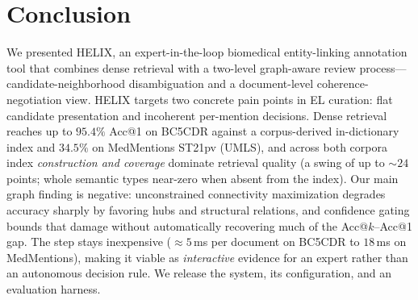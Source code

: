 \documentclass[runningheads]{llncs}
\begin{document}
\section{Conclusion}
\label{sec:conclusion}

We presented HELIX, an expert-in-the-loop biomedical entity-linking annotation
tool that combines dense retrieval with a two-level graph-aware review
process---candidate-neighborhood disambiguation and a document-level
coherence-negotiation view. HELIX targets two concrete
pain points in EL curation: flat candidate presentation and incoherent
per-mention decisions. Dense retrieval reaches up to $95.4\%$ Acc@1 on BC5CDR against
a corpus-derived in-dictionary index and $34.5\%$ on MedMentions ST21pv (UMLS), and
across both corpora index \emph{construction and coverage} dominate retrieval quality
(a swing of up to ${\sim}24$ points; whole semantic types near-zero when absent from
the index). Our main graph finding is negative: unconstrained connectivity
maximization degrades accuracy sharply by favoring hubs and structural relations,
and confidence gating bounds that damage without automatically recovering much of the
Acc@$k$--Acc@1 gap. The step stays inexpensive (${\approx}5$\,ms per document on
BC5CDR to $18$\,ms on MedMentions), making it viable as \emph{interactive} evidence
for an expert rather than an autonomous decision rule. We release the system, its
configuration, and an evaluation harness.



\end{document}
